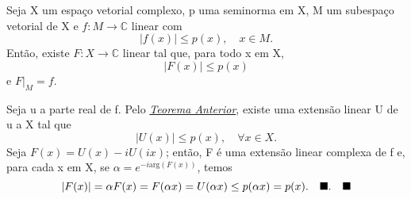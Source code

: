 \documentclass[../functional_analysis.tex]{subfiles}
\begin{document}
    \hypertarget{complex_hahn_banach}{
     \begin{theorem*}
       Seja X um espaço vetorial complexo, p uma seminorma em X, M um subespaço vetorial de X e \(f:M\rightarrow \mathbb{C}\) linear com 
         \[
           |f(x)|\leq p(x),\quad x\in M.
         \]
         Então, existe \(F:X\rightarrow \mathbb{C}\) linear tal que, para todo x em X, 
           \[
             |F(x)|\leq p(x)
           \]
           e \(F|_{M}=f.\)
     \end{theorem*}
    }
   \begin{proof*}
     Seja u a parte real de f. Pelo \hyperlink{hahn_banach}{\textit{Teorema Anterior}}, existe uma extensão linear U de u a X tal que 
       \[
         |U(x)|\leq p(x),\quad \forall x\in X.
       \]
       Seja \(F(x)=U(x)-iU(ix)\); então, F é uma extensão linear complexa de f e, para cada x em X, se \(\alpha =e^{-i \mathrm{arg}(F(x))}\), temos 
         \[
           |F(x)|=\alpha F(x)=F(\alpha x)=U(\alpha x)\leq p(\alpha x)=p(x).\quad \text{$\blacksquare$}.\quad \text{$\blacksquare$}
         \]
   \end{proof*}
\end{document}
